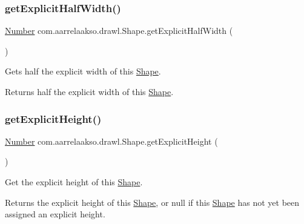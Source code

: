 \subsubsection{\texorpdfstring{get\+Explicit\+Half\+Width()}{getExplicitHalfWidth()}}
{\footnotesize\ttfamily \hyperlink{interfacecom_1_1aarrelaakso_1_1drawl_1_1_number}{Number} com.\+aarrelaakso.\+drawl.\+Shape.\+get\+Explicit\+Half\+Width (\begin{DoxyParamCaption}{ }\end{DoxyParamCaption})\hspace{0.3cm}{\ttfamily [protected]}}



Gets half the explicit width of this \hyperlink{classcom_1_1aarrelaakso_1_1drawl_1_1_shape}{Shape}. 

\begin{DoxyReturn}{Returns}
half the explicit width of this \hyperlink{classcom_1_1aarrelaakso_1_1drawl_1_1_shape}{Shape}. 
\end{DoxyReturn}
\mbox{\label{classcom_1_1aarrelaakso_1_1drawl_1_1_shape_a48917787cedbfd447cd37edbb59a1145}} 
\subsubsection{\texorpdfstring{get\+Explicit\+Height()}{getExplicitHeight()}}
{\footnotesize\ttfamily \hyperlink{interfacecom_1_1aarrelaakso_1_1drawl_1_1_number}{Number} com.\+aarrelaakso.\+drawl.\+Shape.\+get\+Explicit\+Height (\begin{DoxyParamCaption}{ }\end{DoxyParamCaption})\hspace{0.3cm}{\ttfamily [protected]}}



Get the explicit height of this \hyperlink{classcom_1_1aarrelaakso_1_1drawl_1_1_shape}{Shape}. 

\begin{DoxyReturn}{Returns}
the explicit height of this \hyperlink{classcom_1_1aarrelaakso_1_1drawl_1_1_shape}{Shape}, or {\ttfamily null} if this \hyperlink{classcom_1_1aarrelaakso_1_1drawl_1_1_shape}{Shape} has not yet been assigned an explicit height. 
\end{DoxyReturn}
\mbox{\label{classcom_1_1aarrelaakso_1_1drawl_1_1_shape_aca08f18bbe102a5cf6a77cb746d42875}} 
